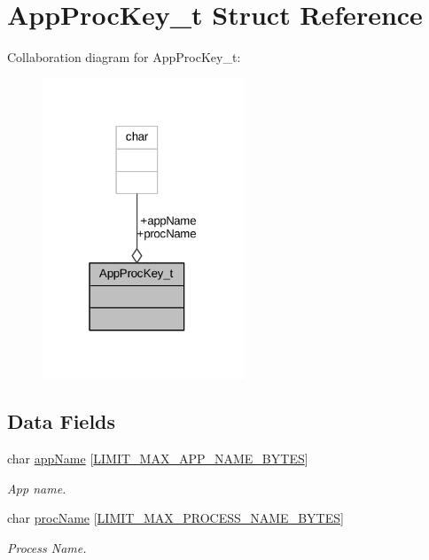 \hypertarget{struct_app_proc_key__t}{}\section{App\+Proc\+Key\+\_\+t Struct Reference}
\label{struct_app_proc_key__t}


Collaboration diagram for App\+Proc\+Key\+\_\+t\+:
\nopagebreak
\begin{figure}[H]
\begin{center}
\leavevmode
\includegraphics[width=171pt]{struct_app_proc_key__t__coll__graph}
\end{center}
\end{figure}
\subsection*{Data Fields}
\begin{DoxyCompactItemize}
\item 
char \hyperlink{struct_app_proc_key__t_ada5fa9789269af3f0f4bbf52f70167c8}{app\+Name} \mbox{[}\hyperlink{limit_8h_a3be1f83793d35365d5f9e765e0ffc619}{L\+I\+M\+I\+T\+\_\+\+M\+A\+X\+\_\+\+A\+P\+P\+\_\+\+N\+A\+M\+E\+\_\+\+B\+Y\+T\+ES}\mbox{]}
\begin{DoxyCompactList}\small\item\em App name. \end{DoxyCompactList}\item 
char \hyperlink{struct_app_proc_key__t_a26c5e602834da2e2c4186afc97a05ba3}{proc\+Name} \mbox{[}\hyperlink{limit_8h_aa34277e61725bc1003ab172a078531cf}{L\+I\+M\+I\+T\+\_\+\+M\+A\+X\+\_\+\+P\+R\+O\+C\+E\+S\+S\+\_\+\+N\+A\+M\+E\+\_\+\+B\+Y\+T\+ES}\mbox{]}
\begin{DoxyCompactList}\small\item\em Process Name. \end{DoxyCompactList}\end{DoxyCompactItemize}


